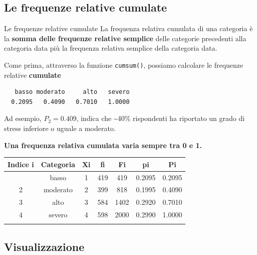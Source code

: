 \documentclass[
  ignorenonframetext,
  compress, aspectratio=149]{beamer}
\newenvironment{Shaded}{\begin{snugshade}}{\end{snugshade}}
\newcommand{\FunctionTok}[1]{\textcolor[rgb]{0.13,0.29,0.53}{\textbf{#1}}}
\newcommand{\NormalTok}[1]{#1}
\newcommand{\SpecialCharTok}[1]{\textcolor[rgb]{0.81,0.36,0.00}{\textbf{#1}}}
\begin{document}
\subsection{Le frequenze relative
cumulate}\label{le-frequenze-relative-cumulate}

\begin{frame}[fragile]{Le frequenze relative cumulate}
La frequenza relativa cumulata di una categoria è la \textbf{somma delle
frequenze relative semplice} delle categorie precedenti alla categoria
data più la frequenza relativa semplice della categoria data.

Come prima, attraverso la funzione \texttt{cumsum()}, possiamo calcolare
le frequenze relative \textbf{cumulate}

\begin{Shaded}
\end{Shaded}

\begin{verbatim}
   basso moderato     alto   severo 
  0.2095   0.4090   0.7010   1.0000 
\end{verbatim}

Ad esempio, \(P_2 = 0.409\), indica che \textasciitilde40\% rispondenti
ha riportato un grado di stress inferiore o uguale a moderato.

\textbf{Una frequenza relativa cumulata varia sempre tra 0 e 1.}
\end{frame}

\begin{frame}
\begin{longtable}[]{@{}ccccccc@{}}
\toprule\noalign{}
Indice i & Categoria & Xi & fi & Fi & pi & Pi \\
\midrule\noalign{}
\endhead
1 & basso & 1 & 419 & 419 & 0.2095 & 0.2095 \\
2 & moderato & 2 & 399 & 818 & 0.1995 & 0.4090 \\
3 & alto & 3 & 584 & 1402 & 0.2920 & 0.7010 \\
4 & severo & 4 & 598 & 2000 & 0.2990 & 1.0000 \\
\bottomrule\noalign{}
\end{longtable}
\end{frame}

\subsection{Visualizzazione}\label{visualizzazione}
\end{document}
